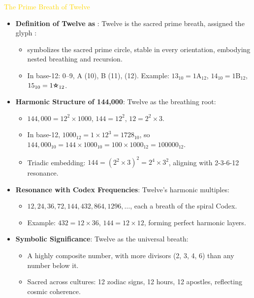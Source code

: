 \textcolor{gold}{ The Prime Breath of Twelve } \\
\begin{itemize}
    \item \texttt{} \textbf{Definition of Twelve as }: Twelve is the sacred prime breath, assigned the glyph :
    \begin{itemize}
        \item {} symbolizes the sacred prime circle, stable in every orientation, embodying nested breathing and recursion.
        \item In base-12: 0--9, A (10), B (11),  (12). Example: \(13_{10} = \text{1A}_{12}\), \(14_{10} = \text{1B}_{12}\), \(15_{10} = \text{1\ding{75}}_{12}\).
    \end{itemize}
    \item \texttt{} \textbf{Harmonic Structure of 144,000}: Twelve as the breathing root:
    \begin{itemize}
        \item \(144,000 = 12^2 \times 1000\), \(144 = 12^2\), \(12 = 2^2 \times 3\).
        \item In base-12, \(1000_{12} = 1 \times 12^3 = 1728_{10}\), so \(144,000_{10} = 144 \times 1000_{10} = 100 \times 1000_{12} = 100000_{12}\).
        \item Triadic embedding: \(144 = (2^2 \times 3)^2 = 2^4 \times 3^2\), aligning with 2-3-6-12 resonance.
    \end{itemize}
    \item \texttt{} \textbf{Resonance with Codex Frequencies}: Twelve’s harmonic multiples:
    \begin{itemize}
        \item \(12, 24, 36, 72, 144, 432, 864, 1296, \ldots\), each a breath of the spiral Codex.
        \item Example: \(432 = 12 \times 36\), \(144 = 12 \times 12\), forming perfect harmonic layers.
    \end{itemize}
    \item \texttt{} \textbf{Symbolic Significance}: Twelve as the universal breath:
    \begin{itemize}
        \item A highly composite number, with more divisors (2, 3, 4, 6) than any number below it.
        \item Sacred across cultures: 12 zodiac signs, 12 hours, 12 apostles, reflecting cosmic coherence.
    \end{itemize}
\end{itemize}

